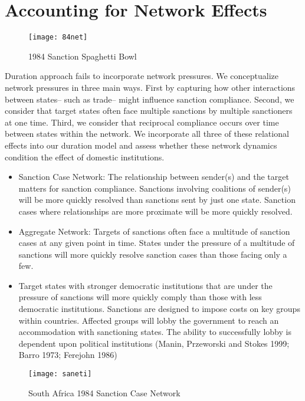 \section{Accounting for Network Effects}
\label{neteffects}

\begin{figure}[ht]
  \centering
  \texttt{[image: 84net]}
  \caption{1984 Sanction Spaghetti Bowl}
\end{figure}

Duration approach fails to incorporate network pressures. We conceptualize network pressures in three main ways. First by capturing how other interactions between states-- such as trade-- might influence sanction compliance. Second, we consider that target states often face multiple sanctions by multiple sanctioners at one time. Third, we consider that reciprocal compliance occurs over time between states within the network. We incorporate all three of these relational effects into our duration model and assess whether these network dynamics condition the effect of domestic institutions. 

\begin{itemize}
\item Sanction Case Network: The relationship between sender(s) and the target matters for sanction compliance. Sanctions involving coalitions of sender(s) will be more quickly resolved than sanctions sent by just one state. Sanction cases where relationships are more proximate will be more quickly resolved.
\item Aggregate Network: Targets of sanctions often face a multitude of sanction cases at any given point in time. States under the pressure of a multitude of sanctions will more quickly resolve sanction cases than those facing only a few.
\item Target states with stronger democratic institutions that are under the pressure of sanctions will more quickly comply than those with less democratic institutions. Sanctions are designed to impose costs on key groups within countries. Affected groups will lobby the government to reach an accommodation with sanctioning states. The ability to successfully lobby is dependent upon political institutions (Manin, Przeworski and Stokes 1999; Barro 1973; Ferejohn 1986)
\end{itemize}

\begin{figure}[ht]
	\centering
	\texttt{[image: saneti]}
	\caption{South Africa 1984 Sanction Case Network}
\end{figure}

